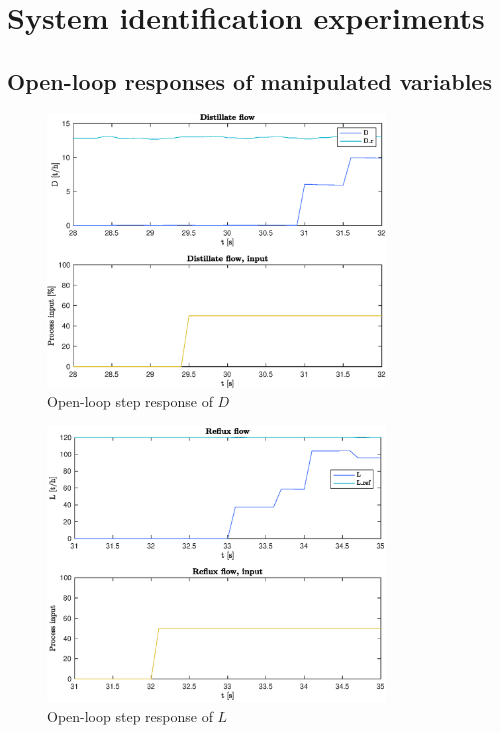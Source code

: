 \documentclass[12pt]{article}
\begin{document}
\newpage
\appendix
\section{System identification experiments}
\subsection{Open-loop responses of manipulated variables}

\begin{figure}[p]
\centering
\includegraphics[width=0.8\textwidth]{../Systemanalyse/Log_Data_to_Matlab/Figurer/Stegeksperimenter/FC1005.eps}
\caption{Open-loop step response of $D$}
\label{fig:ol_step_FC1005}
\end{figure}

\begin{figure}[p]
\centering
\includegraphics[width=0.8\textwidth]{../Systemanalyse/Log_Data_to_Matlab/Figurer/Stegeksperimenter/FC1015.eps}
\caption{Open-loop step response of $L$}
\label{fig:ol_step_FC1015}
\end{figure}
\end{document}
